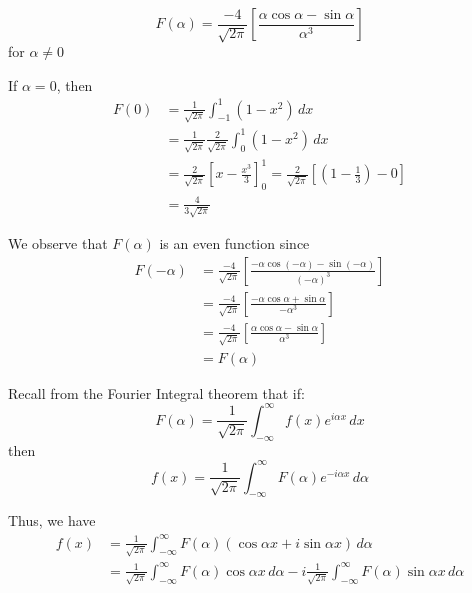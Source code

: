 \documentclass[12pt]{scrartcl}
\begin{document}
\begin{soln}
\begin{mdframed}[style=mybox]
	\[
	F(\alpha) = \frac{-4}{\sqrt{2\pi}}  \left[ \frac{\alpha \cos \alpha - \sin \alpha}{\alpha^3} \right]
\]
for $\alpha \neq 0$
\end{mdframed}

If $\alpha = 0$, then
\begin{align*}
	F(0) & = \frac{1}{\sqrt{2\pi}} \int_{-1}^{1} (1 - x^2) \, dx \\
		 & = \frac{1}{\sqrt{2\pi}}  \frac{2}{\sqrt{2\pi}} \int_{0}^{1} (1 - x^2) \, dx \\
		 & = \frac{2}{\sqrt{2\pi}} \left[ x - \frac{x^3}{3} \right]_{0}^{1} = \frac{2}{\sqrt{2\pi}} \left[ \left( 1 - \frac{1}{3} \right) - 0 \right] \\
		 & = \frac{4}{3\sqrt{2\pi}}
\end{align*}

\begin{mdframed}[style=observebox]
	We observe that $F(\alpha)$ is an even function since
	\begin{align*}
	F(-\alpha) & = \frac{-4}{\sqrt{2\pi}}  \left[ \frac{-\alpha \cos(-\alpha) - \sin (-\alpha)}{(-\alpha)^3} \right] \\
			   & = \frac{-4}{\sqrt{2\pi}}  \left[ \frac{-\alpha \cos \alpha + \sin \alpha}{-\alpha^3} \right] \\
			   & = \frac{-4}{\sqrt{2\pi}}  \left[ \frac{\alpha \cos \alpha - \sin \alpha}{\alpha^3} \right] \\
			   & = F(\alpha)
\end{align*}
\end{mdframed}


\begin{mdframed}[style=recallbox]
	Recall from the Fourier Integral theorem that if:
	\[
	F(\alpha) = \frac{1}{\sqrt{2\pi}} \int_{-\infty}^{\infty} f(x) e^{i\alpha x} \, dx
\]
then 
\[
	f(x) = \frac{1}{\sqrt{2\pi}} \int_{-\infty}^{\infty} F(\alpha) e^{-i\alpha x} \, d\alpha
\]
\end{mdframed}
Thus, we have 
\begin{align*}
	f(x) & = \frac{1}{\sqrt{2\pi}} \int_{-\infty}^{\infty} F(\alpha) (\cos \alpha x + i\sin \alpha x) \, d\alpha \\
		 & = \frac{1}{\sqrt{2\pi}} \int_{-\infty}^{\infty} F(\alpha) \cos \alpha x \, d\alpha - i \frac{1}{\sqrt{2\pi}} \int_{-\infty}^{\infty} F(\alpha) \sin \alpha x \, d\alpha
\end{align*}


\end{soln}
\end{document}

